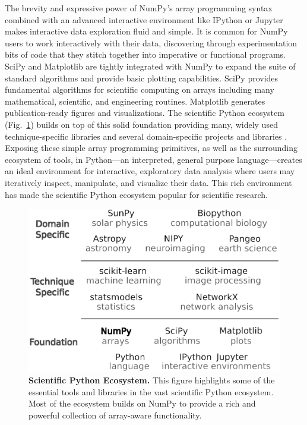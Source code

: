 The brevity and expressive power of NumPy's array programming syntax combined with 
an advanced interactive environment like IPython \cite{perez2007ipython}
or Jupyter \cite{Kluyver:2016aa} makes interactive data exploration fluid and simple.
It is common for NumPy users to work interactively with their data,
discovering through experimentation bits of code that they stitch together into
imperative or functional programs.
SciPy and Matplotlib are tightly integrated with NumPy to expand the suite of
standard algorithms and provide basic plotting capabilities.
SciPy provides fundamental algorithms for scientific computing on arrays
including many mathematical, scientific, and engineering routines.
Matplotlib generates publication-ready figures and visualizations.
The scientific Python ecosystem (Fig.~\ref{fig:ecosystem}) builds on top of
this solid foundation providing many, widely used technique-specific
libraries\cite{pedregosa2011scikit,vanderwalt2014scikit,SciPyProceedings_11}
and several domain-specific projects and libraries
\cite{astropy:2013,astropy:2018,cock2009biopython,millman2007analysis,2018EGUGA..2012146H}.
Exposing these simple array programming primitives, as well as the surrounding ecosystem of
tools, in Python---an interpreted, general purpose language---creates an ideal environment for
interactive, exploratory data analysis where users may iteratively inspect,
manipulate, and visualize their data.
This rich environment has made the scientific Python ecosystem popular for scientific
research.

\begin{figure}
  \centering
  \includegraphics[width=.48\textwidth]{static/ecosystem}
  \caption{\textbf{Scientific Python Ecosystem.}
   This figure highlights some of the essential tools and libraries in the vast
   scientific Python ecosystem.  Most of the ecosystem builds on NumPy to
   provide a rich and powerful collection of array-aware functionality.
  }
  \label{fig:ecosystem}
\end{figure}

